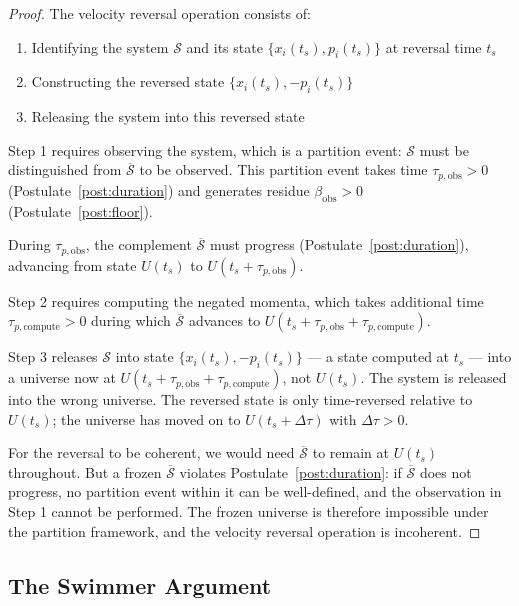 \documentclass[11pt,twocolumn,a4paper]{article}
\theoremstyle{plain}
\theoremstyle{definition}
\theoremstyle{remark}
\begin{document}
\begin{proof}
The velocity reversal operation consists of:
\begin{enumerate}
    \item Identifying the system $\mathcal{S}$ and its state $\{x_i(t_s),
          p_i(t_s)\}$ at reversal time $t_s$
    \item Constructing the reversed state $\{x_i(t_s), -p_i(t_s)\}$
    \item Releasing the system into this reversed state
\end{enumerate}
Step 1 requires observing the system, which is a partition event: $\mathcal{S}$
must be distinguished from $\overline{\mathcal{S}}$ to be observed. This
partition event takes time $\tau_{p,\mathrm{obs}} > 0$
(Postulate~\ref{post:duration}) and generates residue
$\beta_{\mathrm{obs}} > 0$ (Postulate~\ref{post:floor}).

During $\tau_{p,\mathrm{obs}}$, the complement $\overline{\mathcal{S}}$ must
progress (Postulate~\ref{post:duration}), advancing from state $U(t_s)$ to
$U(t_s + \tau_{p,\mathrm{obs}})$.

Step 2 requires computing the negated momenta, which takes additional time
$\tau_{p,\mathrm{compute}} > 0$ during which $\overline{\mathcal{S}}$ advances
to $U(t_s + \tau_{p,\mathrm{obs}} + \tau_{p,\mathrm{compute}})$.

Step 3 releases $\mathcal{S}$ into state $\{x_i(t_s), -p_i(t_s)\}$ --- a state
computed at $t_s$ --- into a universe now at
$U(t_s + \tau_{p,\mathrm{obs}} + \tau_{p,\mathrm{compute}})$, not $U(t_s)$. The
system is released into the wrong universe. The reversed state is only
time-reversed relative to $U(t_s)$; the universe has moved on to
$U(t_s + \Delta\tau)$ with $\Delta\tau > 0$.

For the reversal to be coherent, we would need $\overline{\mathcal{S}}$ to
remain at $U(t_s)$ throughout. But a frozen $\overline{\mathcal{S}}$ violates
Postulate~\ref{post:duration}: if $\overline{\mathcal{S}}$ does not progress,
no partition event within it can be well-defined, and the observation in Step 1
cannot be performed. The frozen universe is therefore impossible under the
partition framework, and the velocity reversal operation is incoherent.
\end{proof}

\subsection{The Swimmer Argument}
\label{subsec:swimmer}
\end{document}
